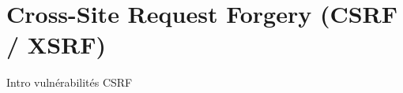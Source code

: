 

\section{Cross-Site Request Forgery (CSRF / XSRF)}\label{vulnerabilites:web:csrf}

Intro vulnérabilités CSRF

\endinput
